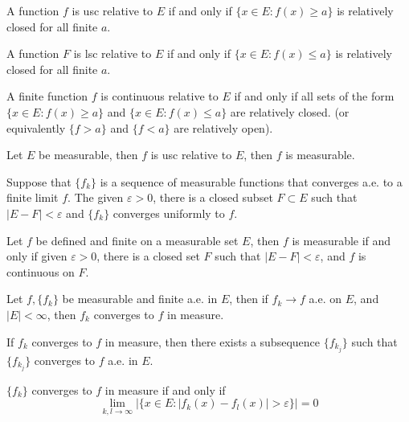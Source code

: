 \documentclass[openany]{book}
\begin{document}
\begin{prop}
    A function $f$ is usc relative to $E$ if and only if $\{x\in E: f(x)\geq a\}$ is relatively closed for all finite $a$.

    A function $F$ is lsc relative to $E$ if and only if $\{x\in E: f(x)\leq a\}$ is relatively closed for all finite $a$.
\end{prop}
\begin{prop}
    A finite function $f$ is continuous relative to $E$ if and only if all sets of the form $\{x\in E: f(x)\geq a\}$ and $\{x\in E:f(x)\leq a\}$ are relatively closed. (or equivalently $\{f>a\}$ and $\{f<a\}$ are relatively open).
\end{prop}
\begin{prop}
    Let $E$ be measurable, then $f$ is usc relative to $E$, then $f$ is measurable.
\end{prop}
\begin{thm}
    Suppose that $\{f_k\}$ is a sequence of measurable functions that converges a.e. to a finite limit $f$. The given $\varepsilon>0$, there is a closed subset $F\subset E$ such that $|E-F|<\varepsilon$ and $\{f_k\}$ converges uniformly to $f$.
\end{thm}
\begin{thm}
    Let $f$ be defined and finite on a measurable set $E$, then $f$ is measurable if and only if given $\varepsilon>0$, there is a closed set $F$ such that $|E-F|<\varepsilon$, and $f$ is continuous on $F$.
\end{thm}
\begin{thm}
    Let $f, \{f_k\}$ be measurable and finite a.e. in $E$, then if $f_k\to f$ a.e. on $E$, and $|E|<\infty$, then $f_k$ converges to $f$ in measure.
\end{thm}
\begin{thm}
    If $f_k$ converges to $f$ in measure, then there exists a subsequence $\{f_{k_j}\}$ such that $\{f_{k_j}\}$ converges to $f$ a.e. in $E$.
\end{thm}
\begin{thm}
    $\{f_k\}$ converges to $f$ in measure if and only if 
    \begin{equation*}
        \lim_{k,l\to\infty}|\{x\in E: |f_k(x)-f_l(x)|>\varepsilon\}|=0
    \end{equation*}
\end{thm}
\end{document}
